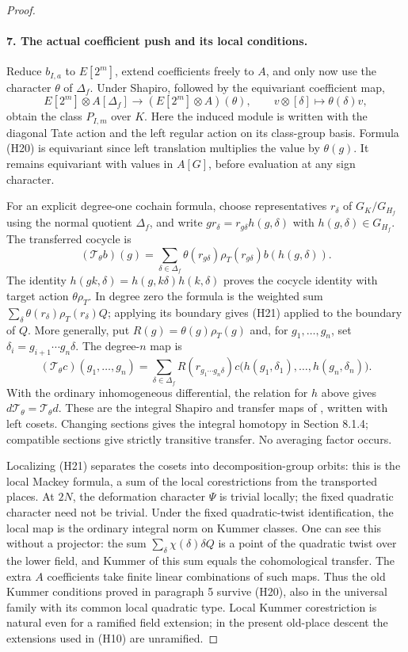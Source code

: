\documentclass[11pt]{article}
\theoremstyle{definition}
\theoremstyle{remark}
\begin{document}
\begin{proof}
\paragraph{7. The actual coefficient push and its local conditions.}
Reduce $b_{I,a}$ to $E[2^m]$, extend coefficients freely to $A$,
and only now use the character $\theta$ of $\Delta_f$.
Under Shapiro, followed by the equivariant coefficient map,
\[
 E[2^m]\otimes A[\Delta_f]\longrightarrow
 (E[2^m]\otimes A)(\theta),\qquad
                     v\otimes[\delta]\longmapsto\theta(\delta)v,
                                                               \tag{H20}
\]
obtain the class $P_{I,m}$ over $K$.
Here the induced module is written with the diagonal Tate action
and the left regular action on its class-group basis. Formula
(H20) is equivariant since left translation multiplies the value
by $\theta(g)$. It remains equivariant with values in $A[G]$,
before evaluation at any sign character.

For an explicit degree-one cochain formula, choose representatives
$r_\delta$ of $G_K/G_{H_f}$ using the normal quotient
$\Delta_f$, and write
$g r_\delta=r_{g\delta}h(g,\delta)$ with $h(g,\delta)\in G_{H_f}$.
The transferred cocycle is
\[
 (\mathcal T_\theta b)(g)=
 \sum_{\delta\in\Delta_f}
  \theta(r_{g\delta})\rho_T(r_{g\delta})b(h(g,\delta)). \tag{H21}
\]
The identity
$h(gk,\delta)=h(g,k\delta)h(k,\delta)$ proves the cocycle
identity with target action $\theta\rho_T$.
In degree zero the formula is the weighted sum
$\sum_\delta\theta(r_\delta)\rho_T(r_\delta)Q$; applying its
boundary gives (H21) applied to the boundary of $Q$.
More generally, put $R(g)=\theta(g)\rho_T(g)$ and, for
$g_1,\ldots,g_n$, set $\delta_i=g_{i+1}\cdots g_n\delta$.
The degree-$n$ map is
\[
 (\mathcal T_\theta c)(g_1,\ldots,g_n)
 =\sum_{\delta\in\Delta_f}R(r_{g_1\cdots g_n\delta})
       c\bigl(h(g_1,\delta_1),\ldots,h(g_n,\delta_n)\bigr).
\]
With the ordinary inhomogeneous differential, the relation for $h$
above gives $d\mathcal T_\theta=\mathcal T_\theta d$.
These are the integral Shapiro and transfer maps of
\cite[Sections 8.1.1--8.1.6, pp.~189--194]{nekovar}, written
with left cosets. Changing sections gives the integral homotopy
in Section 8.1.4; compatible sections give strictly transitive
transfer. No averaging factor occurs.

Localizing (H21) separates the cosets into decomposition-group
orbits: this is the local Mackey formula, a sum of the local
corestrictions from the transported places.
At $2N$, the deformation character $\Psi$ is trivial locally;
the fixed quadratic character need not be trivial. Under the
fixed quadratic-twist identification, the local map is the
ordinary integral norm on Kummer classes. One can see this
without a projector: the sum $\sum_\delta\chi(\delta)\delta Q$
is a point of the quadratic twist over the lower field, and
Kummer of this sum equals the cohomological transfer.
The extra $A$ coefficients take finite linear combinations of
such maps. Thus the old Kummer conditions proved in paragraph 5
survive (H20), also in the universal family with its common local
quadratic type. Local Kummer corestriction is natural even for
a ramified field extension; in the present old-place descent
the extensions used in (H10) are unramified.


\end{proof}
\end{document}
